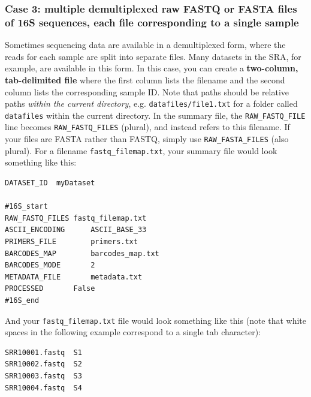 \documentclass[11pt, oneside]{article}   	%
\begin{document}
\subsubsection{Case 3: multiple demultiplexed raw FASTQ or FASTA files of 16S sequences, each file corresponding to a single sample}
Sometimes sequencing data are available in a demultiplexed form, where the reads for each sample are split into separate files.  Many datasets in the SRA, for example, are available in this form.  In this case, you can create a \textbf{two-column, tab-delimited file} where the first column lists the filename and the second column lists the corresponding sample ID.  Note that paths should be relative paths \textit{within the current directory}, e.g. {\tt datafiles/file1.txt} for a folder called {\tt datafiles} within the current directory.  In the summary file, the {\tt RAW\_FASTQ\_FILE} line becomes {\tt RAW\_FASTQ\_FILES} (plural), and instead refers to this filename.  If your files are FASTA rather than FASTQ, simply use {\tt RAW\_FASTA\_FILES} (also plural).  For a filename {\tt fastq\_filemap.txt}, your summary file would look something like this:

\begin{verbatim}
DATASET_ID	myDataset

#16S_start
RAW_FASTQ_FILES	fastq_filemap.txt
ASCII_ENCODING		ASCII_BASE_33
PRIMERS_FILE		primers.txt
BARCODES_MAP		barcodes_map.txt
BARCODES_MODE		2
METADATA_FILE		metadata.txt
PROCESSED		False
#16S_end
\end{verbatim}

And your {\tt fastq\_filemap.txt} file would look something like this (note that white spaces in the following example correspond to a single tab character):

\begin{verbatim}
SRR10001.fastq	S1
SRR10002.fastq	S2
SRR10003.fastq	S3
SRR10004.fastq	S4
\end{verbatim}
\end{document}
